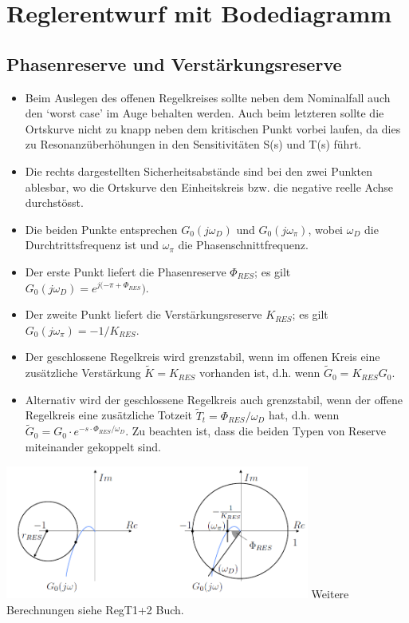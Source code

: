 \section{Reglerentwurf mit Bodediagramm }

\subsection{Phasenreserve und Verstärkungsreserve }
\begin{multicols}{2}
\begin{itemize}
\item Beim Auslegen des offenen Regelkreises sollte neben dem Nominalfall
auch den ‘worst case’ im Auge behalten werden. Auch beim letzteren sollte die
Ortskurve nicht zu knapp neben dem kritischen Punkt vorbei laufen, da dies zu
Resonanzüberhöhungen in den Sensitivitäten S(s) und T(s) führt.
\item Die rechts dargestellten Sicherheitsabstände sind bei den zwei Punkten ablesbar,
wo die Ortskurve den Einheitskreis bzw. die negative reelle Achse durchstösst.
\item Die beiden Punkte entsprechen $G_0(j\omega_D)$ und $G_0(j\omega_{\pi})$, wobei $\omega_D$ die Durchtrittsfrequenz
ist und $\omega_{\pi}$ die Phasenschnittfrequenz.
\item Der erste Punkt liefert die Phasenreserve $\Phi_{RES}$; es gilt $G_0(j\omega_D) = e^{j(-\pi+\Phi_{RES}})$. 
\item Der zweite Punkt liefert die Verstärkungsreserve $K_{RES}$; es gilt $G_0(j\omega_{\pi}) = -1/K_{RES}$. 
\item Der geschlossene Regelkreis wird grenzstabil, wenn im offenen Kreis eine zusätzliche Verstärkung $\widetilde{K} = K_{RES}$ vorhanden ist, d.h. wenn $\widetilde{G}_0 = K_{RES}G_0$.
\item Alternativ wird der geschlossene Regelkreis auch grenzstabil, wenn der offene Regelkreis eine zusätzliche Totzeit $\widetilde{T}_t = \Phi_{RES}/\omega_D$ hat,
d.h. wenn $\widetilde{G}_0 = G_0\cdot e^{-s\cdot\Phi_{RES}/\omega_D}$. Zu beachten ist, dass die beiden Typen von Reserve
miteinander gekoppelt sind.
\end{itemize}
		\includegraphics[width=10cm]{./images/PhasenVerstaerkungReserve.png}
\hspace*{2.5cm}Weitere Berechnungen siehe RegT1+2 Buch.
\end{multicols}
